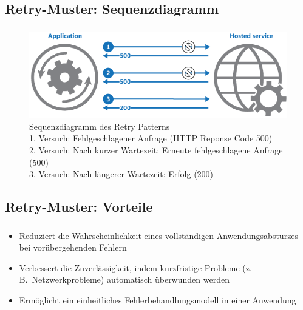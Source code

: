 \subsection{Retry-Muster: Sequenzdiagramm}
\begin{frame}
    \frametitle{\insertsection}
    \framesubtitle{\insertsubsection}

    \begin{figure}[h]
        \centering
        \vspace*{-10pt} %
        \includegraphics[height=0.40\textheight]{../images/retry-pattern2}
        \caption{Sequenzdiagramm des Retry Patterns~\cite{Microsoft.}\\
        1. Versuch: Fehlgeschlagener Anfrage (HTTP Reponse Code 500)\\
        2. Versuch: Nach kurzer Wartezeit: Erneute fehlgeschlagene Anfrage (500)\\
        3. Versuch: Nach längerer Wartezeit: Erfolg (200)\\
        }
    \end{figure}
\end{frame}

\subsection{Retry-Muster: Vorteile}
\begin{frame}
    \frametitle{\insertsection}
    \framesubtitle{\insertsubsection}

    \begin{itemize}
    \item Reduziert die Wahrscheinlichkeit eines vollständigen Anwendungsabsturzes bei vorübergehenden Fehlern
    \item Verbessert die Zuverlässigkeit, indem kurzfristige Probleme (z.\,B.\ Netzwerkprobleme) automatisch überwunden
    werden
    \item Ermöglicht ein einheitliches Fehlerbehandlungsmodell in einer Anwendung
\end{itemize}
\end{frame}

